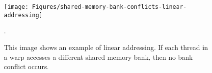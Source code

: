 \begin{figure}[H]
\centering
\texttt{[image: Figures/shared-memory-bank-conflicts-linear-addressing]}
\decoRule
\caption{This image shows an example of linear addressing. If each thread in a warp accesses a different shared memory bank, then no bank conflict occurs.}.
\label{fig:shared-memory-linear-addressing}
\end{figure}


